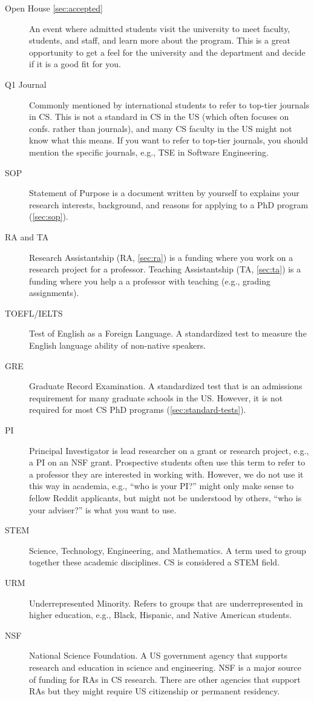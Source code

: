 \documentclass[oneside,11pt,dvipsnames]{book}
\begin{document}
\begin{description}
  \item[Open House \autoref{sec:accepted}] An event where admitted students visit the university to meet faculty, students, and staff, and learn more about the program. This is a great opportunity to get a feel for the university and the department and decide if it is a good fit for you.
  
  \item[Q1 Journal] Commonly mentioned by international students to refer to top-tier journals in CS.  This is not a standard in CS in the US (which often focuses on confs. rather than journals), and many CS faculty in the US might not know what this means.  If you want to refer to top-tier journals, you should mention the specific journals, e.g., TSE in Software Engineering.
  
  \item[SOP] Statement of Purpose is a document written by yourself to explains your research interests, background, and reasons for applying to a PhD program (\autoref{sec:sop}).

  \item[RA and TA] Research Assistantship (RA, \autoref{sec:ra}) is a funding where you work on a research project for a professor. Teaching Assistantship (TA, \autoref{sec:ta}) is a funding where you help a a professor with teaching (e.g., grading assignments).

  \item[TOEFL/IELTS] Test of English as a Foreign Language. A standardized test to measure the English language ability of non-native speakers.
  \item[GRE] Graduate Record Examination. A standardized test that is an admissions requirement for many graduate schools in the US. However, it is not required for most CS PhD programs (\autoref{sec:standard-tests}).

  \item [PI]  Principal Investigator is lead researcher on a grant or research project, e.g., a PI on an NSF grant.  Prospective students often use this term to refer to a professor they are interested in working with.  However, we do not use it this way in academia, e.g., ``who is your PI?'' might only make sense to fellow Reddit applicants, but might not be understood by others, ``who is your adviser?'' is what you want to use.
    \item[STEM] Science, Technology, Engineering, and Mathematics. A term used to group together these academic disciplines. CS is considered a STEM field.
  \item[URM] Underrepresented Minority. Refers to groups that are underrepresented in higher education, e.g., Black, Hispanic, and Native American students.
  \item[NSF] National Science Foundation. A US government agency that supports research and education in science and engineering. NSF is a major source of funding for RAs in CS research. There are other agencies that support RAs but they might require US citizenship or permanent residency.
    

\end{description}
\end{document}
